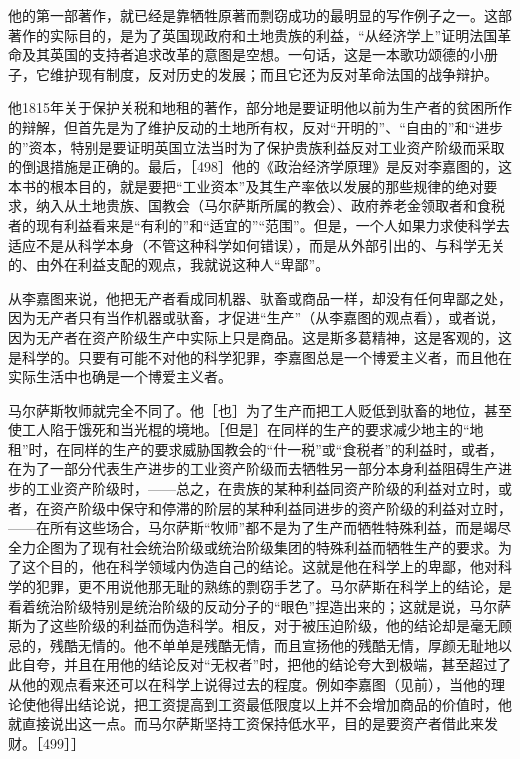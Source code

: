他的第一部著作，就已经是靠牺牲原著而剽窃成功的最明显的写作例子之一。这部著作的实际目的，是为了英国现政府和土地贵族的利益，“从经济学上”证明法国革命及其英国的支持者追求改革的意图是空想。一句话，这是一本歌功颂德的小册子，它维护现有制度，反对历史的发展；而且它还为反对革命法国的战争辩护。

他1815年关于保护关税和地租的著作，部分地是要证明他以前为生产者的贫困所作的辩解，但首先是为了维护反动的土地所有权，反对“开明的”、“自由的”和“进步的”资本，特别是要证明英国立法当时为了保护贵族利益反对工业资产阶级而采取的倒退措施是正确的。最后，［498］他的《政治经济学原理》是反对李嘉图的，这本书的根本目的，就是要把“工业资本”及其生产率依以发展的那些规律的绝对要求，纳入从土地贵族、国教会（马尔萨斯所属的教会）、政府养老金领取者和食税者的现有利益看来是“有利的”和“适宜的”“范围”。但是，一个人如果力求使科学去适应不是从科学本身（不管这种科学如何错误），而是从外部引出的、与科学无关的、由外在利益支配的观点，我就说这种人“卑鄙”。

从李嘉图来说，他把无产者看成同机器、驮畜或商品一样，却没有任何卑鄙之处，因为无产者只有当作机器或驮畜，才促进“生产”（从李嘉图的观点看），或者说，因为无产者在资产阶级生产中实际上只是商品。这是斯多葛精神，这是客观的，这是科学的。只要有可能不对他的科学犯罪，李嘉图总是一个博爱主义者，而且他在实际生活中也确是一个博爱主义者。

马尔萨斯牧师就完全不同了。他［也］为了生产而把工人贬低到驮畜的地位，甚至使工人陷于饿死和当光棍的境地。［但是］在同样的生产的要求减少地主的“地租”时，在同样的生产的要求威胁国教会的“什一税”或“食税者”的利益时，或者，在为了一部分代表生产进步的工业资产阶级而去牺牲另一部分本身利益阻碍生产进步的工业资产阶级时，——总之，在贵族的某种利益同资产阶级的利益对立时，或者，在资产阶级中保守和停滞的阶层的某种利益同进步的资产阶级的利益对立时，——在所有这些场合，马尔萨斯“牧师”都不是为了生产而牺牲特殊利益，而是竭尽全力企图为了现有社会统治阶级或统治阶级集团的特殊利益而牺牲生产的要求。为了这个目的，他在科学领域内伪造自己的结论。这就是他在科学上的卑鄙，他对科学的犯罪，更不用说他那无耻的熟练的剽窃手艺了。马尔萨斯在科学上的结论，是看着统治阶级特别是统治阶级的反动分子的“眼色”捏造出来的；这就是说，马尔萨斯为了这些阶级的利益而伪造科学。相反，对于被压迫阶级，他的结论却是毫无顾忌的，残酷无情的。他不单单是残酷无情，而且宣扬他的残酷无情，厚颜无耻地以此自夸，并且在用他的结论反对“无权者”时，把他的结论夸大到极端，甚至超过了从他的观点看来还可以在科学上说得过去的程度。例如李嘉图（见前），当他的理论使他得出结论说，把工资提高到工资最低限度以上并不会增加商品的价值时，他就直接说出这一点。而马尔萨斯坚持工资保持低水平，目的是要资产者借此来发财。［499］］

